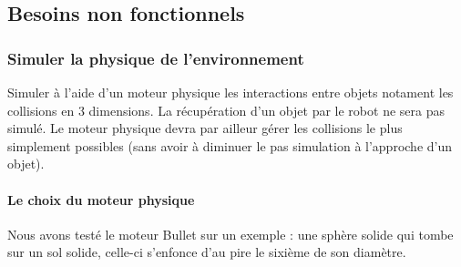 \subsection{Besoins non fonctionnels}

\subsubsection{Simuler la physique de l'environnement}
Simuler à l'aide d'un moteur physique les interactions entre objets notament les collisions en 3 dimensions. La récupération d'un objet par le robot ne sera pas simulé. Le moteur physique devra par ailleur gérer les collisions le plus simplement possibles (sans avoir à diminuer le pas simulation à l'approche d'un objet).

\paragraph{Le choix du moteur physique}
Nous avons testé le moteur Bullet sur un exemple : une sphère solide qui tombe sur un sol solide, celle-ci s'enfonce d'au pire le sixième de son diamètre.

